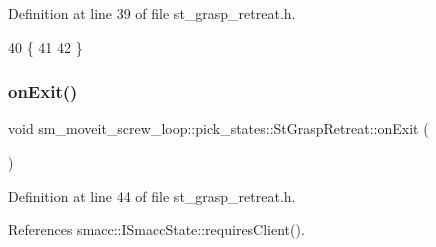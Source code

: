 Definition at line 39 of file st\+\_\+grasp\+\_\+retreat.\+h.


\begin{DoxyCode}
40     \{
41         
42     \}
\end{DoxyCode}
\mbox{\label{structsm__moveit__screw__loop_1_1pick__states_1_1StGraspRetreat_a8ce5ee5a1281a831a2b93966b022d83f}} 
\subsubsection{\texorpdfstring{on\+Exit()}{onExit()}}
{\footnotesize\ttfamily void sm\+\_\+moveit\+\_\+screw\+\_\+loop\+::pick\+\_\+states\+::\+St\+Grasp\+Retreat\+::on\+Exit (\begin{DoxyParamCaption}\item[{\hyperlink{structsmacc_1_1default__transition__tags_1_1SUCCESS}{S\+U\+C\+C\+E\+SS}}]{ }\end{DoxyParamCaption})\hspace{0.3cm}{\ttfamily [inline]}}



Definition at line 44 of file st\+\_\+grasp\+\_\+retreat.\+h.



References smacc\+::\+I\+Smacc\+State\+::requires\+Client().


